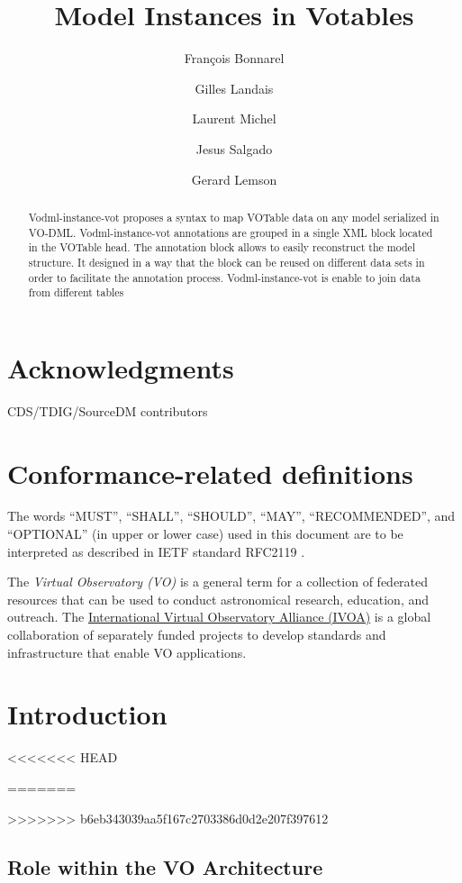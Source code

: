 \documentclass[11pt,a4paper]{ivoa}
\title{Model Instances in Votables}
\author{François Bonnarel}
\author{Gilles Landais}
\author{Laurent Michel}
\author{Jesus Salgado}
\author{Gerard Lemson}
\begin{document}
\begin{abstract}
Vodml-instance-vot proposes a syntax to map VOTable data on any model serialized in VO-DML.
Vodml-instance-vot annotations are grouped in a single XML block located in the VOTable head. The annotation block allows to easily reconstruct the model structure. It designed in a way that the block can be reused on different data sets in order to facilitate the annotation process.
Vodml-instance-vot is enable to join data from different tables
\end{abstract}


\section*{Acknowledgments}
CDS/TDIG/SourceDM contributors

\section*{Conformance-related definitions}

The words ``MUST'', ``SHALL'', ``SHOULD'', ``MAY'', ``RECOMMENDED'', and
``OPTIONAL'' (in upper or lower case) used in this document are to be
interpreted as described in IETF standard RFC2119 \citep{std:RFC2119}.

The \emph{Virtual Observatory (VO)} is a
general term for a collection of federated resources that can be used
to conduct astronomical research, education, and outreach.
The \href{http://www.ivoa.net}{International
Virtual Observatory Alliance (IVOA)} is a global
collaboration of separately funded projects to develop standards and
infrastructure that enable VO applications.

\pagebreak
\section{Introduction}
<<<<<<< HEAD

=======

>>>>>>> b6eb343039aa5f167c2703386d0d2e207f397612

\subsection{Role within the VO Architecture}
\end{document}

